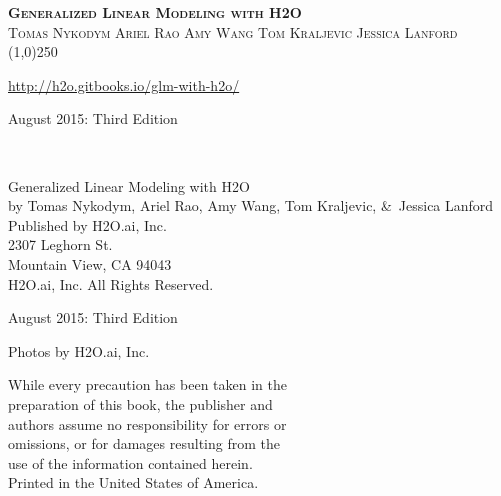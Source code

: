 









\thispagestyle{empty} %

\begin{center}
\textsc{\Large\bf{Generalized Linear Modeling with H2O}}
\\
\bigskip
\textsc{\small{Tomas Nykodym \hspace{20pt} Ariel Rao \hspace{20pt} Amy Wang \hspace{20pt} Tom Kraljevic \hspace{20pt} Jessica Lanford}}
\\
\bigskip
\line(1,0){250}  %

{\url{http://h2o.gitbooks.io/glm-with-h2o/}}

\bigskip
August 2015: Third Edition 
\\%
\bigskip
\end{center}

{\raggedright\vfill\ 

Generalized Linear Modeling with H2O\\
  by Tomas Nykodym, Ariel Rao, Amy Wang, Tom Kraljevic, \&\ Jessica Lanford \\
\bigskip
  Published by H2O.ai, Inc. \\
2307 Leghorn St. \\
Mountain View, CA 94043\\
\bigskip
{} H2O.ai, Inc. All Rights Reserved. 
\bigskip

August 2015: Third Edition
\bigskip

Photos by \textcopyright H2O.ai, Inc.
\bigskip

While every precaution has been taken in the\\
preparation of this book, the publisher and\\
authors assume no responsibility for errors or\\
omissions, or for damages resulting from the\\
use of the information contained herein.\\
\bigskip
Printed in the United States of America. 
}


